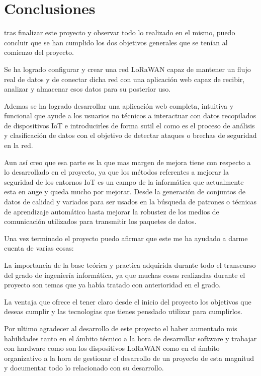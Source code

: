 

\section{Conclusiones}
tras finalizar este proyecto y observar todo lo realizado en el mismo, puedo concluir que se han cumplido los dos objetivos generales que se tenían al comienzo del proyecto.

Se ha logrado configurar y crear una red LoRaWAN capaz de mantener un flujo real de datos y de conectar dicha red con una aplicación web capaz de recibir, analizar y almacenar esos datos para su posterior uso.

Ademas se ha logrado desarrollar una aplicación web completa, intuitiva y funcional que ayude a los usuarios no técnicos a interactuar con datos recopilados de dispositivos IoT e introducirles de forma sutil el como es el proceso de análisis y clasificación de datos con el objetivo de detectar ataques o brechas de seguridad en la red. 

Aun así creo que esa parte es la que mas margen de mejora tiene con respecto a lo desarrollado en el proyecto, ya que los métodos referentes a mejorar la seguridad de los entornos IoT es un campo de la informática que actualmente esta en auge y queda mucho por mejorar. Desde la generación de conjuntos de datos de calidad y variados para ser usados en la búsqueda de patrones o técnicas de aprendizaje automático hasta mejorar la robustez de los medios de comunicación utilizados para transmitir los paquetes de datos.

Una vez terminado el proyecto puedo afirmar que este me ha ayudado a darme cuenta de varias cosas:

La importancia de la base teórica y practica adquirida durante todo el transcurso del grado de ingeniería informática, ya que muchas cosas realizadas durante el proyecto son temas que ya había tratado con anterioridad en el grado.

La ventaja que ofrece el tener claro desde el inicio del proyecto los objetivos que deseas cumplir y las tecnologias que tienes pensdado utilizar para cumplirlos.

Por ultimo agradecer al desarrollo de este proyecto el haber aumentado mis habilidades tanto en el ámbito técnico a la hora de desarrollar software y trabajar con hardware como son los dispositivos LoRaWAN como en el ámbito organizativo a la hora de gestionar el desarrollo de un proyecto de esta magnitud y documentar todo lo relacionado con su desarrollo.


